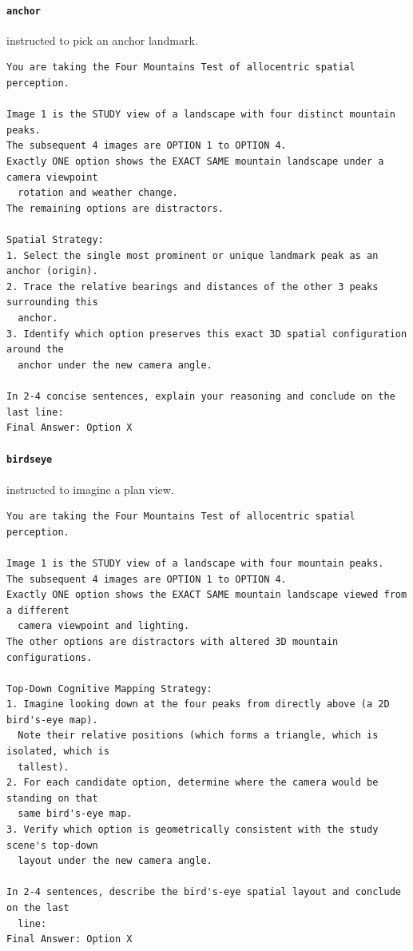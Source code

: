 \paragraph{\texttt{anchor}} instructed to pick an anchor landmark.

\begin{footnotesize}
\begin{verbatim}
You are taking the Four Mountains Test of allocentric spatial perception.

Image 1 is the STUDY view of a landscape with four distinct mountain peaks.
The subsequent 4 images are OPTION 1 to OPTION 4.
Exactly ONE option shows the EXACT SAME mountain landscape under a camera viewpoint
  rotation and weather change.
The remaining options are distractors.

Spatial Strategy:
1. Select the single most prominent or unique landmark peak as an anchor (origin).
2. Trace the relative bearings and distances of the other 3 peaks surrounding this
  anchor.
3. Identify which option preserves this exact 3D spatial configuration around the
  anchor under the new camera angle.

In 2-4 concise sentences, explain your reasoning and conclude on the last line:
Final Answer: Option X
\end{verbatim}
\end{footnotesize}

\paragraph{\texttt{birdseye}} instructed to imagine a plan view.

\begin{footnotesize}
\begin{verbatim}
You are taking the Four Mountains Test of allocentric spatial perception.

Image 1 is the STUDY view of a landscape with four mountain peaks.
The subsequent 4 images are OPTION 1 to OPTION 4.
Exactly ONE option shows the EXACT SAME mountain landscape viewed from a different
  camera viewpoint and lighting.
The other options are distractors with altered 3D mountain configurations.

Top-Down Cognitive Mapping Strategy:
1. Imagine looking down at the four peaks from directly above (a 2D bird's-eye map).
  Note their relative positions (which forms a triangle, which is isolated, which is
  tallest).
2. For each candidate option, determine where the camera would be standing on that
  same bird's-eye map.
3. Verify which option is geometrically consistent with the study scene's top-down
  layout under the new camera angle.

In 2-4 sentences, describe the bird's-eye spatial layout and conclude on the last
  line:
Final Answer: Option X
\end{verbatim}
\end{footnotesize}

